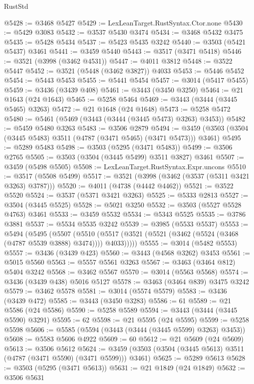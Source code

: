 \begin{lexlean}{RustStd}
\begin{coremodule}
@5428 := @3468 @5427
@5429 := LexLeanTarget.RustSyntax.Ctor.none
@5430 := @5429 @3083
@5432 := @3537 @5430 @3474
@5434 := @3468 @5432 @3475
@5435 := @5428 @5434
@5437 := @5423 @5435 @3242
@5440 := @3503 (@5421 @5437) @3461
@5441 := @3459 @5440
@5443 := @3517 (@3471 @5418)
@5446 := @3521 (@3998 (@3462 @4531))
@5447 := @4011 @3812
@5448 := @3522 @5447
@5452 := @3521 (@5448 (@3462 @3827)) @4033
@5453 := @5446 @5452
@5454 := @5443 @5453
@5455 := @5441 @5454
@5457 := @3014 (@5417 @5455)
@5459 := @3436 (@3439 @408)
@5461 := @3443 (@3450 @3250)
@5464 := @21 @1643 (@24 @1643)
@5465 := @5258 @5464
@5469 := @3443 (@3444 (@3445 @5465) @3263)
@5472 := @21 @1648 (@24 @1648)
@5473 := @5258 @5472
@5480 := @5461 (@5469 (@3443 (@3444 (@3445 @5473) @3263) @3453))
@5482 := @5459 @5480 @3263
@5483 := @3506 @2879
@5494 := @3459 (@3503 (@3504 (@3445 @5483) @3511 (@4787 (@3471 @5465) (@3471 @5473))) @3461)
@5495 := @5289 @5483
@5498 := @3503 (@5295 (@3471 @5483))
@5499 := @3506 @2765
@5505 := @3503 (@3504 (@3445 @5499) @3511 @3827) @3461
@5507 := @3459 (@5498 @5505)
@5508 := LexLeanTarget.RustSyntax.Expr.uncons
@5510 := @3517 (@5508 @5499)
@5517 := @3521 (@3998 (@3462 (@3537 (@5311 @3421 @3263) @3787)))
@5520 := @4011 (@4738 (@4442 @4462))
@5521 := @3522 @5520
@5524 := @3537 (@5371 @3421 @3263)
@5525 := @5333 @2813
@5527 := @3504 (@3445 @5525)
@5528 := @5021 @3250
@5532 := @3503 (@5527 @5528 @4763) @3461
@5533 := @3459 @5532
@5534 := @5343 @5525
@5535 := @3786 @3881
@5537 := @5534 @5535 @3242
@5539 := @3985 (@5533 @5537)
@5553 := @5494
    (@5495
      (@5507
        (@5510 (@5517 (@3521 (@5521 (@3462 (@5524 (@3468 (@4787 @5539 @3888) @3474)))) @4033)))))
@5555 := @3014 (@5482 @5553)
@5557 := @3436 (@3439 @423)
@5560 := @3443 (@4568 @3262) @3453
@5561 := @5015 @5560
@5563 := @5557 @5561 @3263
@5567 := @3463 (@3464 @812) @5404 @3242
@5568 := @3462 @5567
@5570 := @3014 (@5563 @5568)
@5574 := @3436 (@3439 @438) @5016 @5127
@5578 := @3463 (@3464 @839) @3475 @3242
@5579 := @3462 @5578
@5581 := @3014 (@5574 @5579)
@5583 := @3436 (@3439 @472)
@5585 := @3443 (@3450 @3283)
@5586 := 61
@5589 := @21 @5586 (@24 @5586)
@5590 := @5258 @5589
@5594 := @3443 (@3444 (@3445 @5590) @3291)
@5595 := 62
@5598 := @21 @5595 (@24 @5595)
@5599 := @5258 @5598
@5606 := @5585 (@5594 (@3443 (@3444 (@3445 @5599) @3263) @3453))
@5608 := @5583 @5606 @4922
@5609 := 60
@5612 := @21 @5609 (@24 @5609)
@5613 := @3506 @5612
@5624 := @3459 (@3503 (@3504 (@3445 @5613) @3511 (@4787 (@3471 @5590) (@3471 @5599))) @3461)
@5625 := @5289 @5613
@5628 := @3503 (@5295 (@3471 @5613))
@5631 := @21 @1849 (@24 @1849)
@5632 := @3506 @5631

\end{coremodule}
\end{lexlean}
